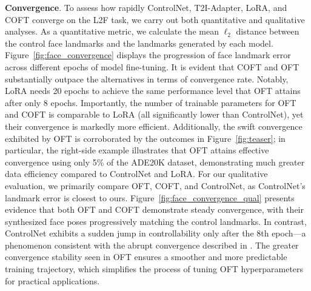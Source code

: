 \textbf{Convergence}. To assess how rapidly ControlNet, T2I-Adapter, LoRA, and COFT converge on the L2F task, we carry out both quantitative and qualitative analyses. As a quantitative metric, we calculate the mean $\ell_2$ distance between the control face landmarks and the landmarks generated by each model. Figure~\ref{fig:face_convergence} displays the progression of face landmark error across different epochs of model fine-tuning. It is evident that COFT and OFT substantially outpace the alternatives in terms of convergence rate. Notably, LoRA needs 20 epochs to achieve the same performance level that OFT attains after only 8 epochs. Importantly, the number of trainable parameters for OFT and COFT is comparable to LoRA (all significantly lower than ControlNet), yet their convergence is markedly more efficient. Additionally, the swift convergence exhibited by OFT is corroborated by the outcomes in Figure~\ref{fig:teaser}; in particular, the right-side example illustrates that OFT attains effective convergence using only 5\% of the ADE20K dataset, demonstrating much greater data efficiency compared to ControlNet and LoRA. For our qualitative evaluation, we primarily compare OFT, COFT, and ControlNet, as ControlNet's landmark error is closest to ours. Figure~\ref{fig:face_convergence_qual} presents evidence that both OFT and COFT demonstrate steady convergence, with their synthesized face poses progressively matching the control landmarks. In contrast, ControlNet exhibits a sudden jump in controllability only after the 8th epoch—a phenomenon consistent with the abrupt convergence described in \cite{zhang2023adding}. The greater convergence stability seen in OFT ensures a smoother and more predictable training trajectory, which simplifies the process of tuning OFT hyperparameters for practical applications.

